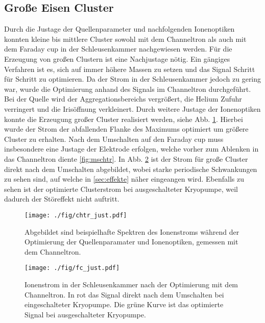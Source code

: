 \subsection{Große Eisen Cluster}
\label{sec:grossecluster}
Durch die Justage der Quellenparameter und nachfolgenden Ionenoptiken konnten kleine bis mittlere Cluster sowohl mit dem Channeltron als auch mit dem Faraday cup in der Schleusenkammer nachgewiesen werden.
Für die Erzeugung von großen Clustern ist eine Nachjustage nötig.
Ein gängiges Verfahren ist es, sich auf immer höhere Massen zu setzen und das Signal Schritt für Schritt zu optimieren.
Da der Strom in der Schleusenkammer jedoch zu gering war, wurde die Optimierung anhand des Signals im Channeltron durchgeführt.
Bei der Quelle wird der Aggregationsbereichs vergrößert, die Helium Zufuhr verringert und
die Irisöffnung verkleinert.
Durch weitere Justage der Ionenoptiken konnte die Erzeugung großer Cluster realisiert werden, siehe Abb. \ref{fig:chtr_just}.
Hierbei wurde der Strom der abfallenden Flanke des Maximums optimiert um größere Cluster zu erhalten.
Nach dem Umschalten auf den Faraday cup muss insbesondere eine Justage der Elektrode erfolgen, welche vorher zum Ablenken in das Channeltron diente \ref{fig:mschtr}.
In Abb. \ref{fig:fc_just} ist der Strom für große Cluster direkt nach dem Umschalten abgebildet, wobei starke periodische Schwankungen zu sehen sind, auf welche in \ref{sec:effekte} näher eingeangen wird.
Ebenfalls zu sehen ist der optimierte Clusterstrom bei ausgeschalteter Kryopumpe, weil dadurch der Störeffekt nicht auftritt.

\begin{figure}
  \centering
  \texttt{[image: ./fig/chtr\_just.pdf]}
  \caption{Abgebildet sind beispielhafte Spektren des Ionenstroms während der Optimierung der Quellenparamater und Ionenoptiken, gemessen mit dem Channeltron.}
  \label{fig:chtr_just}
\end{figure}

\begin{figure}
  \centering
  \texttt{[image: ./fig/fc\_just.pdf]}
  \caption{Ionenstrom in der Schleusenkammer nach der Optimierung mit dem Channeltron. In rot das Signal direkt nach dem Umschalten bei eingeschalteter Kryopumpe. Die grüne Kurve ist das optimierte Signal bei ausgeschalteter Kryopumpe.}
  \label{fig:fc_just}
\end{figure}

